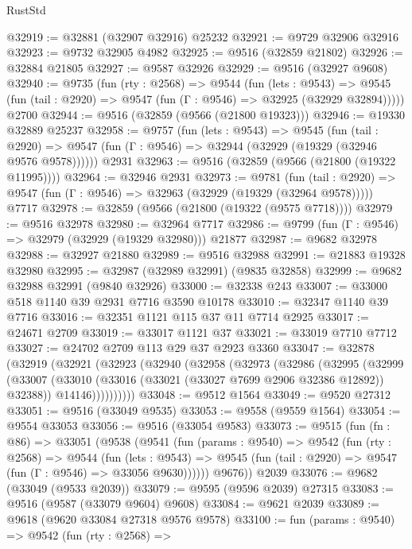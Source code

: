 \begin{lexlean}{RustStd}
\begin{coremodule}
@32919 := @32881 (@32907 @32916) @25232
@32921 := @9729 @32906 @32916
@32923 := @9732 @32905 @4982
@32925 := @9516 (@32859 @21802)
@32926 := @32884 @21805
@32927 := @9587 @32926
@32929 := @9516 (@32927 @9608)
@32940 := @9735
    (fun (rty : @2568) =>
    @9544
      (fun (lets : @9543) =>
      @9545 (fun (tail : @2920) => @9547 (fun (Γ : @9546) => @32925 (@32929 @32894)))))
    @2700
@32944 := @9516 (@32859 (@9566 (@21800 @19323)))
@32946 := @19330 @32889 @25237
@32958 := @9757
    (fun (lets : @9543) =>
    @9545
      (fun (tail : @2920) =>
      @9547 (fun (Γ : @9546) => @32944 (@32929 (@19329 (@32946 @9576 @9578))))))
    @2931
@32963 := @9516 (@32859 (@9566 (@21800 (@19322 @11995))))
@32964 := @32946 @2931
@32973 := @9781
    (fun (tail : @2920) => @9547 (fun (Γ : @9546) => @32963 (@32929 (@19329 (@32964 @9578)))))
    @7717
@32978 := @32859 (@9566 (@21800 (@19322 (@9575 @7718))))
@32979 := @9516 @32978
@32980 := @32964 @7717
@32986 := @9799 (fun (Γ : @9546) => @32979 (@32929 (@19329 @32980))) @21877
@32987 := @9682 @32978
@32988 := @32927 @21880
@32989 := @9516 @32988
@32991 := @21883 @19328 @32980
@32995 := @32987 (@32989 @32991) (@9835 @32858)
@32999 := @9682 @32988 @32991 (@9840 @32926)
@33000 := @32338 @243
@33007 := @33000 @518 @1140 @39 @2931 @7716 @3590 @10178
@33010 := @32347 @1140 @39 @7716
@33016 := @32351 @1121 @115 @37 @11 @7714 @2925
@33017 := @24671 @2709
@33019 := @33017 @1121 @37
@33021 := @33019 @7710 @7712
@33027 := @24702 @2709 @113 @29 @37 @2923 @3360
@33047 := @32878
    (@32919
      (@32921
        (@32923
          (@32940
            (@32958
              (@32973
                (@32986
                  (@32995
                    (@32999
                      (@33007
                        (@33010 (@33016 (@33021 (@33027 @7699 @2906 @32386 @12892)) @32388))
                        @14146))))))))))
@33048 := @9512 @1564
@33049 := @9520 @27312
@33051 := @9516 (@33049 @9535)
@33053 := @9558 (@9559 @1564)
@33054 := @9554 @33053
@33056 := @9516 (@33054 @9583)
@33073 := @9515
    (fun (fn : @86) =>
    @33051
      (@9538
        (@9541
          (fun (params : @9540) =>
          @9542
            (fun (rty : @2568) =>
            @9544
              (fun (lets : @9543) =>
              @9545 (fun (tail : @2920) => @9547 (fun (Γ : @9546) => @33056 @9630))))))
        @9676))
    @2039
@33076 := @9682 (@33049 (@9533 @2039))
@33079 := @9595 (@9596 @2039) @27315
@33083 := @9516 (@9587 (@33079 @9604) @9608)
@33084 := @9621 @2039
@33089 := @9618 (@9620 @33084 @27318 @9576 @9578)
@33100 := fun (params : @9540) =>
  @9542
    (fun (rty : @2568) =>

\end{coremodule}
\end{lexlean}
